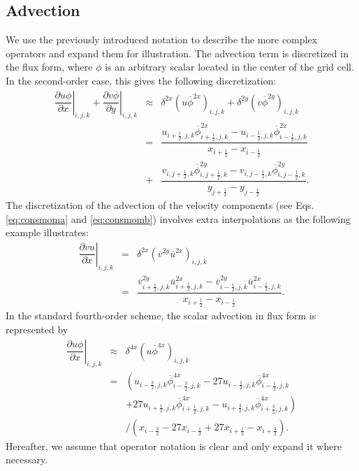 \documentclass[gmd,manuscript]{copernicus}
\begin{document}
\subsection{Advection}
We use the previously introduced notation to describe the more complex operators and expand them for illustration. The advection term is discretized in the flux form, where $\phi$ is an arbitrary scalar located in the center of the grid cell. In the second-order case, this gives the following discretization:
\begin{eqnarray}
\nonumber
\left. \dfrac{\partial u \phi}{\partial x}\right|_{i,j,k} + \left. \dfrac{\partial v \phi}{\partial y} \right|_{i,j,k} & \approx & 
\delta^{2x} \left( u \overline{\phi}^{2x} \right)_{i,j,k} + \delta^{2y} \left( v \overline{\phi}^{2y} \right)_{i,j,k} \\ 
\nonumber
& = & \dfrac{ u_{i+\frac{1}{2},j,k} \overline{\phi}^{2x}_{i+\frac{1}{2},j,k} - u_{i-\frac{1}{2},j,k} \overline{\phi}^{2x}_{i-\frac{1}{2},j,k} }
            { x_{i+\frac{1}{2}} - x_{i-\frac{1}{2}} }\\
& + & \dfrac{ v_{i,j+\frac{1}{2},k} \overline{\phi}^{2y}_{i,j+\frac{1}{2},k} - v_{i,j-\frac{1}{2},k} \overline{\phi}^{2y}_{i,j-\frac{1}{2},k} }
            { y_{j+\frac{1}{2}} - y_{j-\frac{1}{2}} }.
\end{eqnarray}
The discretization of the advection of the velocity components (see Eqs. \ref{eq:consmoma} and \ref{eq:consmomb}) involves extra interpolations as the following example illustrates:
\begin{eqnarray}
\nonumber
\left. \dfrac{\partial v u}{\partial x} \right|_{i,j,k} & = & \delta^{2x} \left( \overline{v}^{2y} \overline{u}^{2x} \right)_{i,j,k} \\
& = & \dfrac{ \overline{v}^{2y}_{i+\frac{1}{2},j,k} \overline{u}^{2x}_{i+\frac{1}{2},j,k} - \overline{v}^{2y}_{i-\frac{1}{2},j,k} \overline{u}^{2x}_{i-\frac{1}{2},j,k} }
      { x_{i+\frac{1}{2}} - x_{i-\frac{1}{2}} }.\label{eq:advec2u}
\end{eqnarray}
In the standard fourth-order scheme, the scalar advection in flux form is represented by
\begin{eqnarray}
\nonumber
\left. \dfrac{\partial u \phi}{\partial x} \right|_{i,j,k} & \approx & \delta^{4x} \left( u \overline{\phi}^{4x} \right)_{i,j,k} \\
\nonumber
& = & \left( u_{i-\frac{3}{2},j,k} \overline{\phi}^{4x}_{i-\frac{3}{2},j,k} - 27 u_{i-\frac{1}{2},j,k} \overline{\phi}^{4x}_{i-\frac{1}{2},j,k} \right.\\
\nonumber
&   &\left. + 27 u_{i+\frac{1}{2},j,k} \overline{\phi}^{4x}_{i+\frac{1}{2},j,k} - u_{i+\frac{3}{2},j,k} \overline{\phi}^{4x}_{i+\frac{3}{2},j,k} \right)\\
&   &\slash \left( x_{i-\frac{3}{2}} - 27 x_{i-\frac{1}{2}} + 27 x_{i+\frac{1}{2}} - x_{i+\frac{3}{2}} \right).
\end{eqnarray}
Hereafter, we assume that operator notation is clear and only expand it where necessary.
\end{document}
